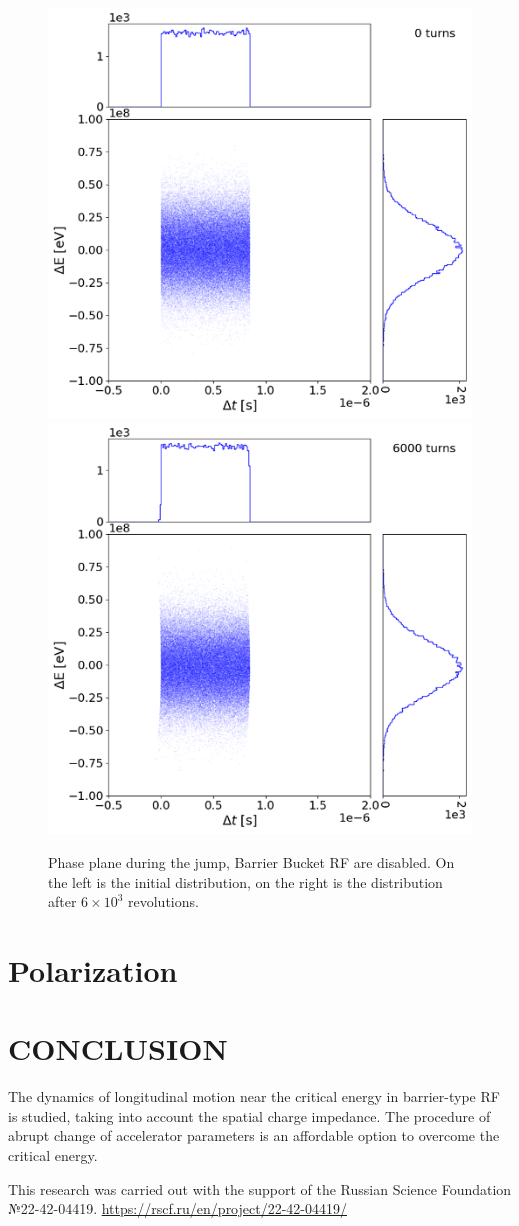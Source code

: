 \documentclass[
aps,%
12pt,%
final,%
notitlepage,%
oneside,%
onecolumn,%
nobibnotes,%
nofootinbib,%
superscriptaddress,%
noshowpacs,%
centertags]%
{revtex4}
\begin{document}
\begin{figure}
\setcaptionmargin{5mm}
   \includegraphics*[width=.49\columnwidth]{img/fig_09-1}
   \includegraphics*[width=.49\columnwidth]{img/fig_09-2}
\caption{Phase plane during the jump, Barrier Bucket RF are disabled. On the left is the initial distribution, on the right is the distribution after $6\times{10}^3$ revolutions.}
\label{fig:exp}
\end{figure}

\section{Polarization}


\section{CONCLUSION}

\par The dynamics of longitudinal motion near the critical energy in barrier-type RF is studied, taking into account the spatial charge impedance. The procedure of abrupt change of accelerator parameters is an affordable option to overcome the critical energy.

\begin{acknowledgments}
This research was carried out with the support of the Russian Science Foundation №22-42-04419.
\url{https://rscf.ru/en/project/22-42-04419/}
\end{acknowledgments}

\nocite{*}

\end{document}
